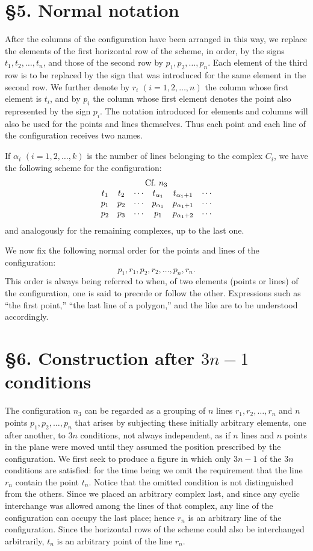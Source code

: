 \documentclass[11pt]{article}
\newcommand{\Cf}{\textup{Cf.}}
\begin{document}
\section*{\S 5. Normal notation}
After the columns of the configuration have been arranged in this way, we replace the elements of the first horizontal row of the scheme, in order, by the signs $t_1,t_2,\ldots,t_n$, and those of the second row by $p_1,p_2,\ldots,p_n$. Each element of the third row is to be replaced by the sign that was introduced for the same element in the second row. We further denote by $r_i$ $(i=1,2,\ldots,n)$ the column whose first element is $t_i$, and by $p_i$ the column whose first element denotes the point also represented by the sign $p_i$. The notation introduced for elements and columns will also be used for the points and lines themselves. Thus each point and each line of the configuration receives two names.

If $\alpha_i$ $(i=1,2,\ldots,k)$ is the number of lines belonging to the complex $C_i$, we have the following scheme for the configuration:
\[
\begin{array}{cccccc}
\multicolumn{6}{c}{\Cf\ n_3}\\
t_1&t_2&\cdots&t_{\alpha_1}&t_{\alpha_1+1}&\cdots\\
p_1&p_2&\cdots&p_{\alpha_1}&p_{\alpha_1+1}&\cdots\\
p_2&p_3&\cdots&p_1&p_{\alpha_1+2}&\cdots
\end{array}
\]
and analogously for the remaining complexes, up to the last one.

We now fix the following normal order for the points and lines of the configuration:
\[
p_1,r_1,p_2,r_2,\ldots,p_n,r_n.
\]
This order is always being referred to when, of two elements (points or lines) of the configuration, one is said to precede or follow the other. Expressions such as “the first point,” “the last line of a polygon,” and the like are to be understood accordingly.

\section*{\S 6. Construction after $3n-1$ conditions}
The configuration $n_3$ can be regarded as a grouping of $n$ lines $r_1,r_2,\ldots,r_n$ and $n$ points $p_1,p_2,\ldots,p_n$ that arises by subjecting these initially arbitrary elements, one after another, to $3n$ conditions, not always independent, as if $n$ lines and $n$ points in the plane were moved until they assumed the position prescribed by the configuration. We first seek to produce a figure in which only $3n-1$ of the $3n$ conditions are satisfied: for the time being we omit the requirement that the line $r_n$ contain the point $t_n$. Notice that the omitted condition is not distinguished from the others. Since we placed an arbitrary complex last, and since any cyclic interchange was allowed among the lines of that complex, any line of the configuration can occupy the last place; hence $r_n$ is an arbitrary line of the configuration. Since the horizontal rows of the scheme could also be interchanged arbitrarily, $t_n$ is an arbitrary point of the line $r_n$.
\end{document}
